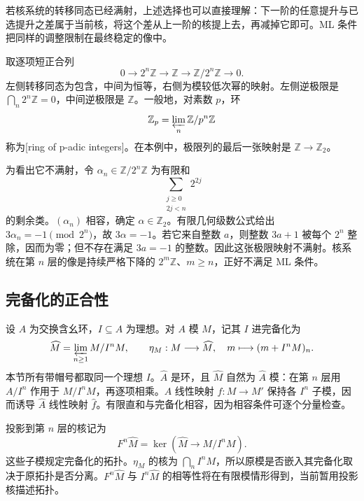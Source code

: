 若核系统的转移同态已经满射，上述选择也可以直接理解：下一阶的任意提升与已选提升之差属于当前核，将这个差从上一阶的核提上去，再减掉它即可。ML 条件把同样的调整限制在最终稳定的像中。

\begin{example}\label{g5:exm:inverse-limit-not-right-exact}
	取逐项短正合列
	\[
		0\longrightarrow2^n\mathbb Z\longrightarrow\mathbb Z
		\longrightarrow\mathbb Z/2^n\mathbb Z\longrightarrow0.
	\]
	左侧转移同态为包含，中间为恒等，右侧为模较低次幂的映射。左侧逆极限是 \(\bigcap_n2^n\mathbb Z=0\)，中间逆极限是 \(\mathbb Z\)。一般地，对素数 \(p\)，环
	\[
		\mathbb Z_p=\varprojlim_n\mathbb Z/p^n\mathbb Z
	\]
	称为[ring of p-adic integers]。在本例中，极限列的最后一张映射是 \(\mathbb Z\to\mathbb Z_2\)。

	为看出它不满射，令 \(\alpha_n\in\mathbb Z/2^n\mathbb Z\) 为有限和
	\[
		\sum_{\substack{j\geq0\\2j<n}}2^{2j}
	\]
	的剩余类。\((\alpha_n)\) 相容，确定 \(\alpha\in\mathbb Z_2\)。有限几何级数公式给出 \(3\alpha_n=-1\pmod{2^n}\)，故 \(3\alpha=-1\)。若它来自整数 \(a\)，则整数 \(3a+1\) 被每个 \(2^n\) 整除，因而为零；但不存在满足 \(3a=-1\) 的整数。因此这张极限映射不满射。核系统在第 \(n\) 层的像是持续严格下降的 \(2^m\mathbb Z\)、\(m\geq n\)，正好不满足 ML 条件。
\end{example}

\subsection{完备化的正合性}
\label{g5:subsec:0703:02}

设 \(A\) 为交换含幺环，\(I\subseteq A\) 为理想。对 \(A\) 模 \(M\)，记其 \(I\) 进完备化为
\[
	\widehat M=\varprojlim_{n\geq1}M/I^nM,
	\qquad
	\eta_M:M\longrightarrow\widehat M,
	\quad m\longmapsto(m+I^nM)_n.
\]
本节所有带帽号都取同一个理想 \(I\)。\(\widehat A\) 是环，且 \(\widehat M\) 自然为 \(\widehat A\) 模：在第 \(n\) 层用 \(A/I^n\) 作用于 \(M/I^nM\)，再逐项相乘。\(A\) 线性映射 \(f:M\to M'\) 保持各 \(I^n\) 子模，因而诱导 \(\widehat A\) 线性映射 \(\widehat f\)。有限直和与完备化相容，因为相容条件可逐个分量检查。

\ProseParagraphBreak

投影到第 \(n\) 层的核记为
\[
	F^n\widehat M=\ker(\widehat M\to M/I^nM).
\]
这些子模规定完备化的拓扑。\(\eta_M\) 的核为 \(\bigcap_n I^nM\)，所以原模是否嵌入其完备化取决于原拓扑是否分离。\(F^n\widehat M\) 与 \(I^n\widehat M\) 的相等性将在有限模情形得到，当前暂用投影核描述拓扑。

